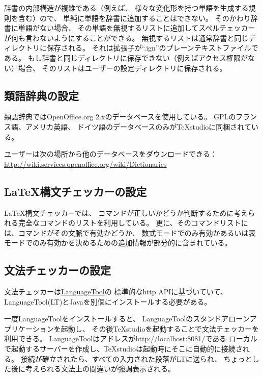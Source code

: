 辞書の内部構造が複雑である（例えば、
様々な変化形を持つ単語を生成する規則を含む）ので、
単純に単語を辞書に追加することはできない。
そのかわり辞書に単語がない場合、
その単語を無視するリストに追加してスペルチェッカーが何も言わないようにすることができる。
無視するリストは通常辞書と同じディレクトリに保存される。
それは拡張子が``.ign''のプレーンテキストファイルである。
もし辞書と同じディレクトリに保存できない（例えばアクセス権限がない）場合、
そのリストはユーザーの設定ディレクトリに保存される。

\subsection{類語辞典の設定}

類語辞典ではOpenOffice.org 2.xのデータベースを使用している。
GPLのフランス語、アメリカ英語、
ドイツ語のデータベースのみがTeXstudioに同梱されている。

ユーザーは次の場所から他のデータベースをダウンロードできる：
\href{http://wiki.services.openoffice.org/wiki/Dictionaries}{http://wiki.services.openoffice.org/wiki/Dictionaries}

\subsection{LaTeX構文チェッカーの設定}

LaTeX構文チェッカーでは、
コマンドが正しいかどうか判断するために考えられる完全なコマンドのリストを利用している。
更に、そのコマンドリストには、コマンドがその文脈で有効かどうか、
数式モードでのみ有効かあるいは表モードでのみ有効かを決めるための追加情報が部分的に含まれている。

\subsection{文法チェッカーの設定}

文法チェッカーは\href{http://www.languagetool.org/}{LanguageTool}の
標準的なhttp APIに基づいていて、LanguageTool(LT)とJavaを別個にインストールする必要がある。

一度LanguageToolをインストールすると、
LanguageToolのスタンドアローンアプリケーションを起動し、
その後TeXstudioを起動することで文法チェッカーを利用できる。
LanguageToolはアドレスがhttp://localhost:8081/である
ローカルで起動するサーバーを作成し、TeXstudioは起動時にそこに自動的に接続される。
接続が確立されたら、すべての入力された段落がLTに送られ、
ちょっとした後に考えられる文法上の間違いが強調表示される。

